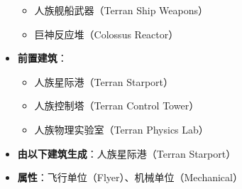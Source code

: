 \begin{tcolorbox}[colback=white, colframe=black!60!white, title=Terran\_Battlecruiser(), arc=0mm]
\begin{itemize}
\begin{itemize}
                \item 人族舰船武器（Terran Ship Weapons）
                \item 巨神反应堆（Colossus Reactor）
            \end{itemize}
        \item \textbf{前置建筑}：
            \begin{itemize}
                \item 人族星际港（Terran Starport）
                \item 人族控制塔（Terran Control Tower）
                \item 人族物理实验室（Terran Physics Lab）
            \end{itemize}
        \item \textbf{由以下建筑生成}：人族星际港（Terran Starport）
        \item \textbf{属性}：飞行单位（Flyer）、机械单位（Mechanical）
    \end{itemize}
\end{tcolorbox}

